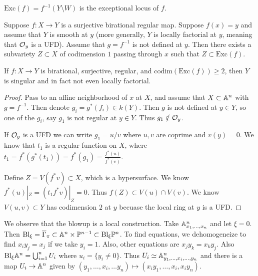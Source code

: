 \documentclass[twoside, 10pt]{article}
\begin{document}
    \begin{defn}
        $\mathrm{Exc}(f) = f^{-1}(Y \setminus W)$ is the exceptional locus of $f$.
    \end{defn}

    \begin{thm}
        Suppose $f:X \to Y$ is a surjective birational regular map. Suppose $f(x) = y$ and assume that $Y$ is smooth at $y$ (more generally, $Y$ is locally factorial at $y$, meaning that $\mathcal{O}_y$ is a UFD). Assume that $g = f^{-1}$ is not defined at $y$. Then there exists a subvariety $Z \subset X$ of codimension $1$ passing through $x$ such that $Z \subset \mathrm{Exc}(f)$.
    \end{thm}
    
    \begin{cor}
        If $f:X \to Y$ is birational, surjective, regular, and $\mathrm{codim}(\mathrm{Exc}(f)) \geq 2$, then $Y$ is singular and in fact not even locally factorial.
        \begin{proof}
            Pass to an affine neighborhood of $x$ at $X$, and assume that $X \subset \mathbb{A}^n$ with $g = f^{-1}$. Then denote $g_i = g^*(f_i) \in k(Y)$. Then $g$ is not defined at $y \in Y$, so one of the $g_i$, say $g_1$ is not regular at $y \in Y$. Thus $g_1 \notin \mathcal{O}_y$.
            
            If $\mathcal{O}_y$ is a UFD we can write $g_1 = u/v$ where $u,v$ are coprime and $v(y) = 0$. We know that $t_1$ is a regular function on $X$, where $t_1 = f^*(g^*(t_1)) = f^*(g_1) = \frac{f^*(u)}{f^*(v)}$.

            Define $Z = V(f^* v) \subset X$, which is a hypersurface. We know $f^*(u)|_Z = (t_1 f^* v)|_Z = 0$. Thus $f(Z) \subset V(u) \cap V(v)$. We know $V(u,v) \subset Y$ has codimension $2$ at $y$ becuase the local ring at $y$ is a UFD.
        \end{proof}
    \end{cor}

    We observe that the blowup is a local construction. Take $\mathbb{A}^n_{x_1, \ldots, x_n}$ and let $\xi = 0$. Then $\mathrm{Bl}_{\xi} = \overline{\Gamma}_{\pi} \subset \mathbb{A}^n \times \mathbb{P}^{n-1} \subset \mathrm{Bl}_{\xi} \mathbb{P}^n$. To find equations, we dehomogeneize to find $x_iy_j=x_j$ if we take $y_i = 1$. Also, other equations are $x_jy_k = x_ky_j$. Also $\mathrm{Bl}_{\xi}\mathbb{A}^n = \bigcup_{i=1}^n U_i$ where $u_i = \{y_i \neq 0\}$. Thus $U_i \simeq \mathbb{A}^n_{y_1, \ldots, x_i, \ldots, y_n}$ and there is a map $U_i \to \mathbb{A}^n$ given by $(y_1, \ldots, x_i, \ldots y_n) \mapsto (x_iy_1, \ldots, x_i, x_iy_n)$.
\end{document}
